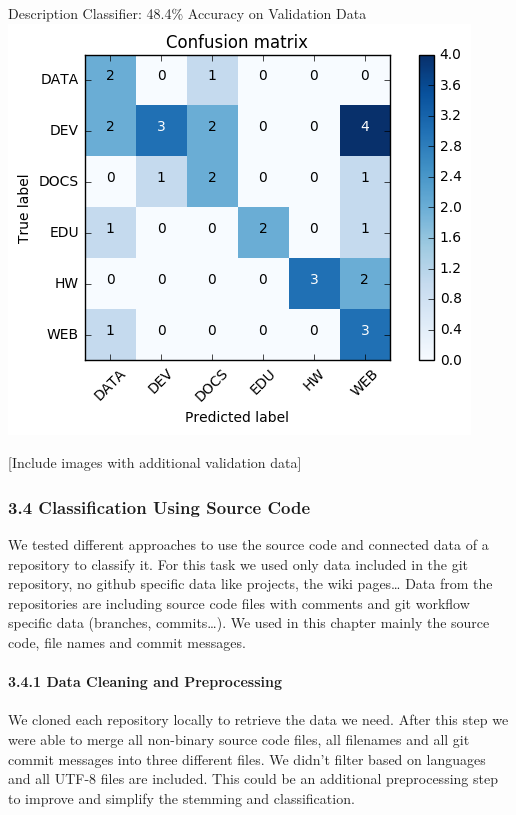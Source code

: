 \documentclass{article}
\begin{document}
Description Classifier: 48.4\% Accuracy on Validation Data\\
\includegraphics{graphics/confusion-matrix-description-classifier.png}

{[}Include images with additional validation data{]}

\subsubsection{3.4 Classification Using Source
Code}\label{classification-using-source-code}

We tested different approaches to use the source code and connected data
of a repository to classify it. For this task we used only data included
in the git repository, no github specific data like projects, the wiki
pages\ldots{} Data from the repositories are including source code files
with comments and git workflow specific data (branches,
commits\ldots{}). We used in this chapter mainly the source code, file
names and commit messages.

\paragraph{3.4.1 Data Cleaning and
Preprocessing}\label{data-cleaning-and-preprocessing-2}

We cloned each repository locally to retrieve the data we need. After
this step we were able to merge all non-binary source code files, all
filenames and all git commit messages into three different files. We
didn't filter based on languages and all UTF-8 files are included. This
could be an additional preprocessing step to improve and simplify the
stemming and classification.
\end{document}
